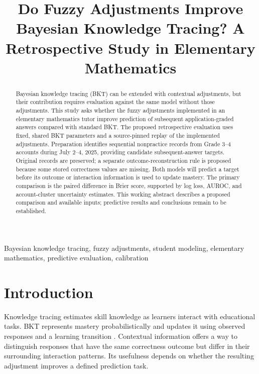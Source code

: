 \documentclass[conference]{IEEEtran}
\newif\ifworkingdraft
\newcommand{\draftnote}[1]{\ifworkingdraft\par\noindent\textcolor{red}{\textbf{Author review:} #1}\par\fi}
\begin{document}
\title{Do Fuzzy Adjustments Improve Bayesian Knowledge Tracing? A Retrospective Study in Elementary Mathematics}
\author{}
\maketitle
\draftnote{Comparative-study draft. The previous audit manuscript is preserved separately. The protocol requires author approval; predictive experiments have not been run. The abstract, results, discussion and conclusion must be completed from actual evaluation outputs before submission.}

\begin{abstract}
Bayesian knowledge tracing (BKT) can be extended with contextual adjustments, but their contribution requires evaluation against the same model without those adjustments. This study asks whether the fuzzy adjustments implemented in an elementary mathematics tutor improve prediction of subsequent application-graded answers compared with standard BKT. The proposed retrospective evaluation uses fixed, shared BKT parameters and a source-pinned replay of the implemented adjustments. Preparation identifies \CandidateResponseCount{} sequential nonpractice records from \CandidateAccountCount{} Grade 3--4 accounts during July 2--4, 2025, providing \CandidateTargetCount{} candidate subsequent-answer targets. Original records are preserved; a separate outcome-reconstruction rule is proposed because some stored correctness values are missing. Both models will predict a target before its outcome or interaction information is used to update mastery. The primary comparison is the paired difference in Brier score, supported by log loss, AUROC, and account-cluster uncertainty estimates. This working abstract describes a proposed comparison and available inputs; predictive results and conclusions remain to be established.
\end{abstract}
\begin{IEEEkeywords}
Bayesian knowledge tracing, fuzzy adjustments, student modeling, elementary mathematics, predictive evaluation, calibration
\end{IEEEkeywords}

\section{Introduction}
Knowledge tracing estimates skill knowledge as learners interact with educational tasks. BKT represents mastery probabilistically and updates it using observed responses and a learning transition \cite{corbett1994}. Contextual information offers a way to distinguish responses that have the same correctness outcome but differ in their surrounding interaction patterns. Its usefulness depends on whether the resulting adjustment improves a defined prediction task.
\end{document}
